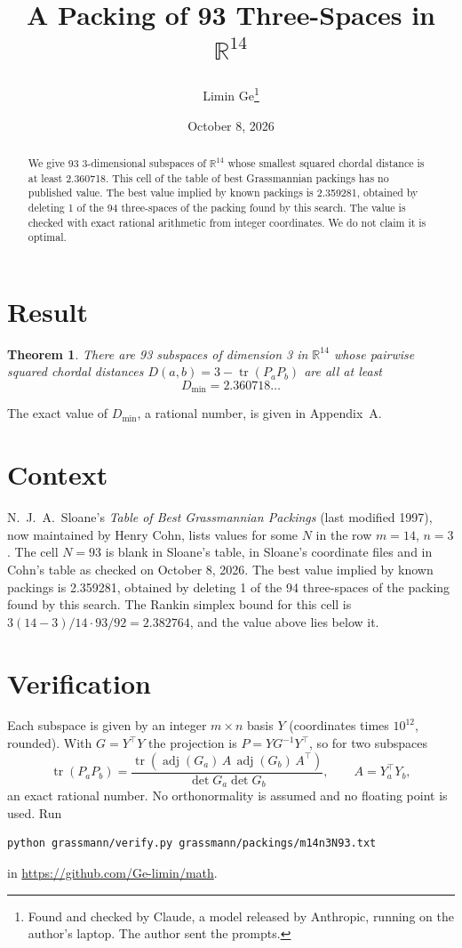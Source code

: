 \documentclass[11pt,a4paper]{article}
\title{A Packing of 93 Three-Spaces in $\mathbb{R}^{14}$}
\author{Limin Ge\thanks{Found and checked by Claude, a model released by Anthropic, running on the author's laptop. The author sent the prompts.}}
\date{October 8, 2026}
\newtheorem*{theorem}{Theorem}
\begin{document}
\maketitle
\begin{abstract}
We give 93 3-dimensional subspaces of $\mathbb{R}^{14}$ whose smallest squared chordal distance is at least 2.360718. This cell of the table of best Grassmannian packings has no published value. The best value implied by known packings is 2.359281, obtained by deleting 1 of the 94 three-spaces of the packing found by this search. The value is checked with exact rational arithmetic from integer coordinates. We do not claim it is optimal.
\end{abstract}

\section{Result}
\begin{theorem}
There are 93 subspaces of dimension 3 in $\mathbb{R}^{14}$ whose pairwise squared chordal distances $D(a,b) = 3 - \operatorname{tr}(P_aP_b)$ are all at least
\[ D_{\min} = 2.360718\ldots \]
\end{theorem}
The exact value of $D_{\min}$, a rational number, is given in Appendix~A.


\section{Context}
N.~J.~A.~Sloane's \emph{Table of Best Grassmannian Packings} (last modified 1997), now maintained by Henry Cohn, lists values for some $N$ in the row $m=14$, $n=3$. The cell $N=93$ is blank in Sloane's table, in Sloane's coordinate files and in Cohn's table as checked on October 8, 2026. The best value implied by known packings is 2.359281, obtained by deleting 1 of the 94 three-spaces of the packing found by this search. The Rankin simplex bound for this cell is $3(14-3)/14\cdot 93/92 = 2.382764$, and the value above lies below it.


\section{Verification}
Each subspace is given by an integer $m\times n$ basis $Y$ (coordinates times $10^{12}$, rounded). With $G=Y^\top Y$ the projection is $P=YG^{-1}Y^\top$, so for two subspaces
\[ \operatorname{tr}(P_aP_b)=\frac{\operatorname{tr}(\operatorname{adj}(G_a)\,A\,\operatorname{adj}(G_b)\,A^\top)}{\det G_a\det G_b},\qquad A=Y_a^\top Y_b, \]
an exact rational number. No orthonormality is assumed and no floating point is used. Run
\begin{verbatim}
python grassmann/verify.py grassmann/packings/m14n3N93.txt
\end{verbatim}
in \url{https://github.com/Ge-limin/math}.
\end{document}
